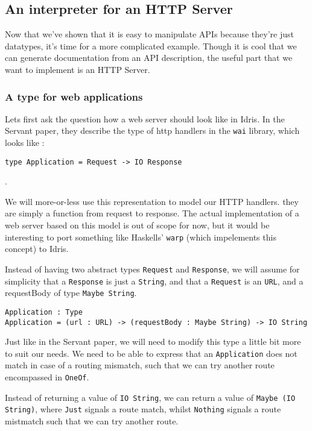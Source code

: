 \documentclass[12pt,a4paper]{article}
\begin{document}
\subsection{An interpreter for an HTTP Server}\label{sec:server}
Now that we've shown that it is easy to manipulate APIs because they're just datatypes, it's time for a more complicated example. Though it is cool that we can generate documentation from an API description, the useful part that we want to implement is an HTTP Server.

\subsubsection{A type for web applications}
Lets first ask the question how a web server should look like in Idris. In the Servant paper, they describe the type of http handlers in the \texttt{wai} library, which looks like \cite{servant}:
\begin{verbatim}
type Application = Request -> IO Response
\end{verbatim}.

We will more-or-less use this representation to model our HTTP handlers. they are  simply a function from request to response.  The actual implementation of a web server based on this model is out of scope for now, but it would be interesting to port something like Haskells' \texttt{warp} (which impelements this concept) to Idris.

Instead of having two abstract types \texttt{Request} and \texttt{Response}, we will assume for simplicity that a \texttt{Response} is just a \texttt{String}, and that a \texttt{Request} is an \texttt{URL}, and a requestBody of type \texttt{Maybe String}.

\begin{verbatim}
Application : Type
Application = (url : URL) -> (requestBody : Maybe String) -> IO String
\end{verbatim}

Just like in the Servant paper, we will need to modify this type a little bit more to suit our needs. We need to be able to express that an \texttt{Application} does not match in case of a routing mismatch, such that we can try another route encompassed in \texttt{OneOf}. 

Instead of returning  a value of \texttt{IO String}, we can return a value of \texttt{Maybe (IO String)}, where \texttt{Just} signals a route match, whilst \texttt{Nothing} signals a route mistmatch such that we can try another route.
\end{document}
